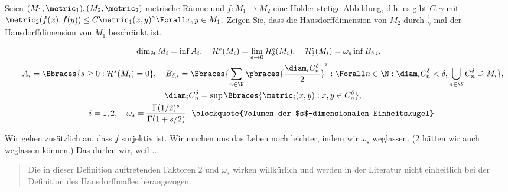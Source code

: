 
\begin{exercise}

Seien $(M_1, \metric_1),(M_2, \metric_2)$ metrische Räume und $f: M_1 \to M_2$ eine Hölder-stetige Abbildung, d.h. es gibt $C, \gamma$ mit $\metric_2(f(x), f(y)) \leq C \metric_1(x, y)^\gamma \Forall x, y \in M_1$.
Zeigen Sie, dass die Hausdorffdimension von $M_2$ durch $\frac{1}{\gamma}$ mal der Hausdorffdimension von $M_1$ beschränkt ist.

\end{exercise}


\begin{solution}

\begin{gather*}
    \dim_\mathcal{H} M_i
    =
    \inf A_i,
    \quad
    \mathcal{H}^s(M_i)
    =
    \lim_{\delta \to 0}
        \mathcal{H}_\delta^s(M_i),
    \quad
    \mathcal{H}_\delta^s(M_i)
    =
    \omega_s
    \inf B_{\delta, i}, \\
    \quad
    A_i
    =
    \Bbraces
    {
        s \geq 0:
        \mathcal{H}^s(M_i) = 0
    },
    \quad
    B_{\delta, i}
    =
    \Bbraces
    {
        \sum_{n \in \N}
            \pbraces
            {
                \frac{\diam_i C_n^\delta}{2}}^s:
                \Forall n \in \N:
                    \diam_i C_n^\delta < \delta,
                \bigcup_{n \in \N} C_n^\delta \supseteq M_i
    }, \\
    \quad
    \diam_i C_n^\delta
    =
    \sup
    \Bbraces
    {
        \metric_i(x, y):
        x, y \in C_n^\delta
    }, \\
    \quad i = 1, 2,
    \quad
    \omega_s
    =
    \frac
    {
        \Gamma(1/2)^s
    }{
        \Gamma(1 + s/2)
    }
    ~\text
    {
        \blockquote{Volumen der $s$-dimensionalen Einheitskugel}
    }
\end{gather*}

Wir gehen zusätzlich an, dass $f$ surjektiv ist.
Wir machen uns das Leben noch leichter, indem wir $\omega_s$ weglassen.
($2$ hätten wir auch weglassen können.)
Das dürfen wir, weil ...

\begin{center}
    \blockquote{Die in dieser Definition auftretenden Faktoren $2$ und $\omega_s$ wirken willkürlich und werden in der Literatur nicht einheitlich bei der Definition des Hausdorffmaßes herangezogen.}
\end{center}


\end{solution}
